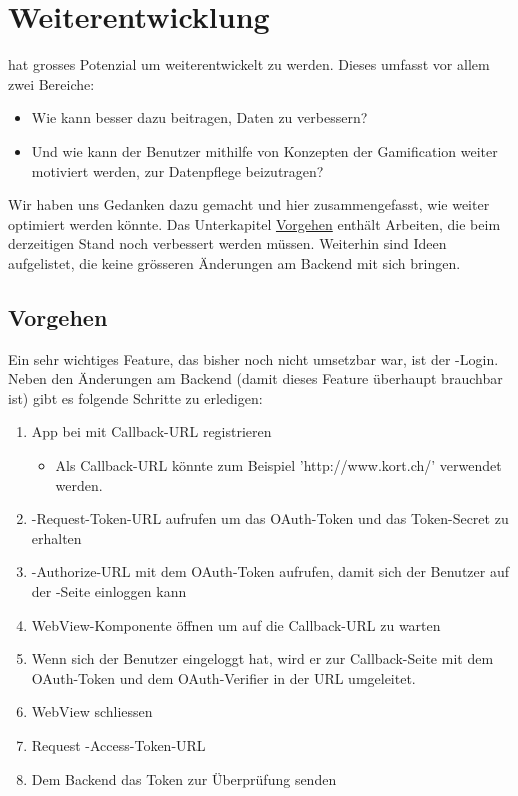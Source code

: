 \chapter{Weiterentwicklung}
\label{pd-weiterentwicklung}

\kort{} hat grosses Potenzial um weiterentwickelt zu werden.
Dieses umfasst vor allem zwei Bereiche:

\begin{itemize}
	\item Wie kann \kort{} besser dazu beitragen,  Daten zu verbessern?
	\item Und wie kann der Benutzer mithilfe von Konzepten der Gamification weiter motiviert werden, zur Datenpflege beizutragen?
\end{itemize}

Wir haben uns Gedanken dazu gemacht und hier zusammengefasst, wie \kort{} weiter optimiert werden könnte.
Das Unterkapitel \hyperref[pd-weiterentwicklung-vorgehen]{Vorgehen} enthält Arbeiten, die beim derzeitigen Stand noch verbessert werden müssen. 
Weiterhin sind Ideen aufgelistet, die keine grösseren Änderungen am Backend mit sich bringen.

\section{Vorgehen}
\label{pd-weiterentwicklung-vorgehen}
Ein sehr wichtiges Feature, das bisher noch nicht umsetzbar war, ist der -Login.
Neben den Änderungen am Backend (damit dieses Feature überhaupt brauchbar ist) gibt es folgende Schritte zu erledigen:

\begin{enumerate}
	\item App bei  mit Callback-URL registrieren
	\begin{itemize}
		\item Als Callback-URL könnte zum Beispiel 'http://www.kort.ch/' verwendet werden.
	\end{itemize}
	\item {}-Request-Token-URL aufrufen um das OAuth-Token und das Token-Secret zu erhalten
	\item {}-Authorize-URL mit dem OAuth-Token aufrufen, damit sich der Benutzer auf der -Seite einloggen kann
	\item WebView-Komponente öffnen um auf die Callback-URL zu warten 
	\item Wenn sich der Benutzer eingeloggt hat, wird er zur Callback-Seite mit dem OAuth-Token und dem OAuth-Verifier in der URL umgeleitet.
	\item WebView schliessen
	\item Request -Access-Token-URL
	\item Dem Backend das Token zur Überprüfung senden
\end{enumerate}

